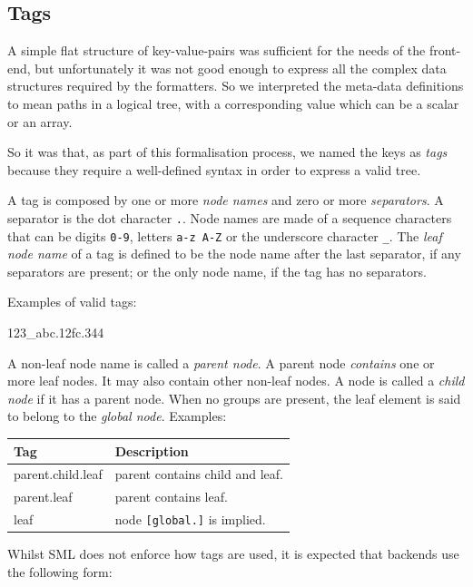 \documentclass{book}
\begin{document}
\subsection{Tags}

A simple flat structure of key-value-pairs was sufficient for the
needs of the front-end, but unfortunately it was not good enough to
express all the complex data structures required by the formatters. So
we interpreted the meta-data definitions to mean paths in a logical
tree, with a corresponding value which can be a scalar or an array.

So it was that, as part of this formalisation process, we named the
keys as \emph{tags} because they require a well-defined syntax in
order to express a valid tree.

A tag is composed by one or more \emph{node names} and zero or more
\emph{separators}. A separator is the dot character \texttt{.}. Node
names are made of a sequence characters that can be digits
\texttt{0-9}, letters \texttt{a-z A-Z} or the underscore character
\texttt{\_}. The \emph{leaf node name} of a tag is defined to be the
node name after the last separator, if any separators are present; or
the only node name, if the tag has no separators.

Examples of valid tags:

\begin{pseudocode}[backgroundcolor=\color{lightgray}]
123_abc.12fc.344
\end{pseudocode}

A non-leaf node name is called a \emph{parent node}. A parent node
\emph{contains} one or more leaf nodes. It may also contain other
non-leaf nodes. A node is called a \emph{child node} if it has a
parent node. When no groups are present, the leaf element is said to
belong to the \emph{global node}. Examples:

\begin{center}
\begin{tabular}{ll}
Tag & Description\\
\hline
parent.child.leaf & parent contains child and leaf.\\
parent.leaf & parent contains leaf.\\
leaf & node \texttt{[global.]} is implied.\\
\end{tabular}
\end{center}

Whilst SML does not enforce how tags are used, it is expected that
backends use the following form:
\end{document}

